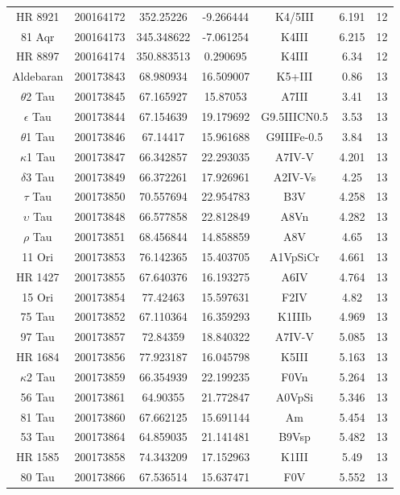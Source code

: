 \begin{table*}
\begin{tabular}{ccccccc}
HR 8921 & 200164172 & 352.25226 & -9.266444 & K4/5III & 6.191 & 12 \\
81 Aqr & 200164173 & 345.348622 & -7.061254 & K4III & 6.215 & 12 \\
HR 8897 & 200164174 & 350.883513 & 0.290695 & K4III & 6.34 & 12 \\
Aldebaran & 200173843 & 68.980934 & 16.509007 & K5+III & 0.86 & 13 \\
$\theta$2 Tau & 200173845 & 67.165927 & 15.87053 & A7III & 3.41 & 13 \\
$\epsilon$ Tau & 200173844 & 67.154639 & 19.179692 & G9.5IIICN0.5 & 3.53 & 13 \\
$\theta$1 Tau & 200173846 & 67.14417 & 15.961688 & G9IIIFe-0.5 & 3.84 & 13 \\
$\kappa$1 Tau & 200173847 & 66.342857 & 22.293035 & A7IV-V & 4.201 & 13 \\
$\delta$3 Tau & 200173849 & 66.372261 & 17.926961 & A2IV-Vs & 4.25 & 13 \\
$\tau$ Tau & 200173850 & 70.557694 & 22.954783 & B3V & 4.258 & 13 \\
$\upsilon$ Tau & 200173848 & 66.577858 & 22.812849 & A8Vn & 4.282 & 13 \\
$\rho$ Tau & 200173851 & 68.456844 & 14.858859 & A8V & 4.65 & 13 \\
11 Ori & 200173853 & 76.142365 & 15.403705 & A1VpSiCr & 4.661 & 13 \\
HR 1427 & 200173855 & 67.640376 & 16.193275 & A6IV & 4.764 & 13 \\
15 Ori & 200173854 & 77.42463 & 15.597631 & F2IV & 4.82 & 13 \\
75 Tau & 200173852 & 67.110364 & 16.359293 & K1IIIb & 4.969 & 13 \\
97 Tau & 200173857 & 72.84359 & 18.840322 & A7IV-V & 5.085 & 13 \\
HR 1684 & 200173856 & 77.923187 & 16.045798 & K5III & 5.163 & 13 \\
$\kappa$2 Tau & 200173859 & 66.354939 & 22.199235 & F0Vn & 5.264 & 13 \\
56 Tau & 200173861 & 64.90355 & 21.772847 & A0VpSi & 5.346 & 13 \\
81 Tau & 200173860 & 67.662125 & 15.691144 & Am & 5.454 & 13 \\
53 Tau & 200173864 & 64.859035 & 21.141481 & B9Vsp & 5.482 & 13 \\
HR 1585 & 200173858 & 74.343209 & 17.152963 & K1III & 5.49 & 13 \\
80 Tau & 200173866 & 67.536514 & 15.637471 & F0V & 5.552 & 13 \\

\end{tabular}
\end{table*}
